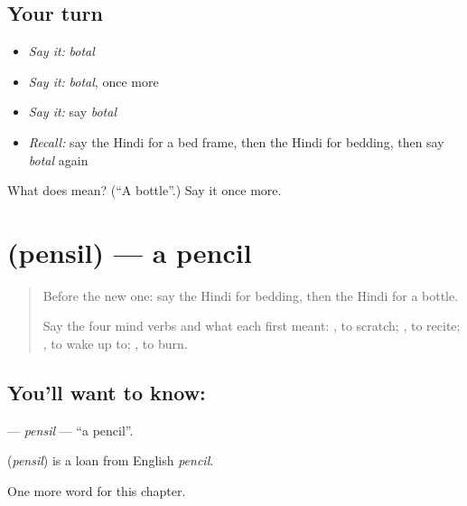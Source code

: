 \subsection*{Your turn}
\begin{itemize}
\raggedright
  \item \emph{Say it:} \emph{botal}
  \item \emph{Say it:} \emph{botal}, once more
  \item \emph{Say it:} say \emph{botal}
  \item \emph{Recall:} say the Hindi for a bed frame, then the Hindi for bedding, then say \emph{botal} again
\end{itemize}

\begin{tcolorbox}[breakable,colback=teal!4,colframe=teal!35!black,title={Before you move on}]
What does  mean? (\textquotedblleft{}A bottle\textquotedblright{}.) Say it once more.
\end{tcolorbox}
\section[\texorpdfstring{\hi{पेंसिल} (pensil)}{पेंसिल (pensil)}]{ (pensil) — a pencil}

\label{lesson:HI-C134-pensil}



\begin{quote}
Before the new one: say the Hindi for bedding, then the Hindi for a bottle.

Say the four mind verbs and what each first meant: \textbf{}, to scratch; \textbf{}, to recite; \textbf{}, to wake up to; \textbf{}, to burn.
\end{quote}

\subsection*{You'll want to know: }
\textbf{} — \emph{pensil} — \textquotedblleft{}a pencil\textquotedblright{}.

\begin{cousinweb}
\textbf{} (\emph{pensil}) is a loan from English \emph{pencil}.
\end{cousinweb}

\begin{grammarlens}[title={What you've built}]
One more word for this chapter.
\end{grammarlens}

